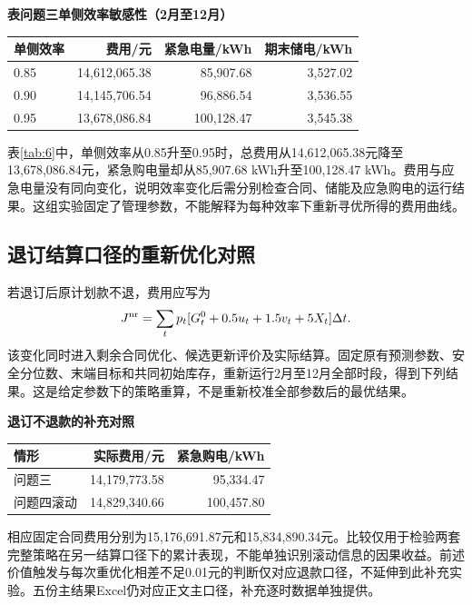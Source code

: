\documentclass[12pt,a4paper]{ctexart}
\newcommand{\papertable}[1]{\refstepcounter{table}\label{tab:\thetable}\textbf{表\thetable\quad #1}}
\begin{document}
\par\addvspace{5pt}\noindent\begin{minipage}{\linewidth}\centering
\small
\papertable{问题三单侧效率敏感性（2月至12月）}\par\vspace{4pt}
\begin{tabular}{lrrr}
\toprule
单侧效率 & 费用/元 & 紧急电量/kWh & 期末储电/kWh \\
\midrule
0.85 & 14,612,065.38 & 85,907.68 & 3,527.02 \\
0.90 & 14,145,706.54 & 96,886.54 & 3,536.55 \\
0.95 & 13,678,086.84 & 100,128.47 & 3,545.38 \\
\bottomrule
\end{tabular}
\end{minipage}\par\addvspace{5pt}

表\ref{tab:6}中，单侧效率从0.85升至0.95时，总费用从14,612,065.38元降至13,678,086.84元，紧急购电量却从85,907.68 kWh升至100,128.47 kWh。费用与应急电量没有同向变化，说明效率变化后需分别检查合同、储能及应急购电的运行结果。这组实验固定了管理参数，不能解释为每种效率下重新寻优所得的费用曲线。

\subsection{退订结算口径的重新优化对照}
若退订后原计划款不退，费用应写为
\begin{equation}
J^{\rm nr}=\sum_t p_t[G_t^0+0.5u_t+1.5v_t+5X_t]\Delta t.
\end{equation}
该变化同时进入剩余合同优化、候选更新评价及实际结算。固定原有预测参数、安全分位数、末端目标和共同初始库存，重新运行2月至12月全部时段，得到下列结果。这是给定参数下的策略重算，不是重新校准全部参数后的最优结果。
\par\addvspace{5pt}\noindent\begin{minipage}{\linewidth}\centering\small
\textbf{退订不退款的补充对照}\par\vspace{4pt}
\begin{tabular}{lrr}\toprule
情形 & 实际费用/元 & 紧急购电/kWh\\\midrule
问题三 & 14,179,773.58 & 95,334.47\\
问题四滚动 & 14,829,340.66 & 100,457.80\\\bottomrule
\end{tabular}\end{minipage}\par\addvspace{5pt}
相应固定合同费用分别为15,176,691.87元和15,834,890.34元。比较仅用于检验两套完整策略在另一结算口径下的累计表现，不能单独识别滚动信息的因果收益。前述价值触发与每次重优化相差不足0.01元的判断仅对应退款口径，不延伸到此补充实验。五份主结果Excel仍对应正文主口径，补充逐时数据单独提供。
\end{document}
